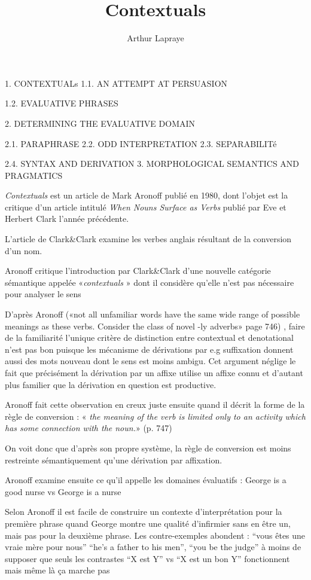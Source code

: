 \documentclass[a4paper,12pt]{article}
\author{Arthur Lapraye}
\title{Contextuals}
\begin{document}
 
 \maketitle
 
 1. CONTEXTUALs
 1.1. AN ATTEMPT AT PERSUASION
 
 1.2. EVALUATIVE PHRASES
 
 2. DETERMINING THE EVALUATIVE DOMAIN
 
 2.1. PARAPHRASE
 2.2. ODD INTERPRETATION
 2.3. SEPARABILITé
 
 2.4. SYNTAX AND DERIVATION
 3. MORPHOLOGICAL SEMANTICS AND PRAGMATICS
 
 
 \textit{Contextuals} est un article de Mark Aronoff publié en 1980, dont l'objet est la critique d'un article intitulé 
 \textit{When Nouns Surface as Verbs} publié par Eve et Herbert Clark l'année précédente. 
 
 L'article de Clark\&Clark examine les verbes anglais résultant de la conversion d'un nom. 
 
 Aronoff critique l'introduction par Clark\&Clark d'une nouvelle catégorie sémantique appelée «\textit{contextuals} » 
 dont il considère qu'elle n'est pas nécessaire pour analyser le sens
 
D'après Aronoff («not all unfamiliar words have the same wide range of possible meanings as these
verbs. Consider the class of novel -ly adverbs» page 746) , faire de la familiarité l'unique critère de distinction entre contextual et denotational 
n'est pas bon puisque les mécanisme de dérivations par e.g suffixation donnent aussi des mots nouveau dont le sens est moins ambigu. 
Cet argument néglige le fait que précisément la dérivation par un affixe utilise un affixe connu 
et d'autant plus familier que la dérivation en question est productive. 

Aronoff fait cette observation en creux juste ensuite quand il décrit la forme de la règle de conversion : 
« \textit{the meaning of the verb is limited only to an activity which has some connection with the noun.}» (p. 747) 

On voit donc que d'après son propre système, la règle de conversion est moins restreinte sémantiquement qu'une dérivation par affixation. 

Aronoff examine ensuite ce qu'il appelle les domaines évaluatifs : 
George is a good nurse vs George is a nurse

Selon Aronoff il est facile de construire un contexte d'interprétation pour la première phrase quand George montre une qualité d'infirmier sans en être
un, mais pas pour la deuxième phrase. Les contre-exemples abondent : 
``vous êtes une vraie mère pour nous'' ``he's a father to his men'', ``you be the judge'' 
à moins de supposer que seuls les contrastes ``X est Y'' vs ``X est un bon Y'' fonctionnent mais même là ça marche pas
\end{document}
